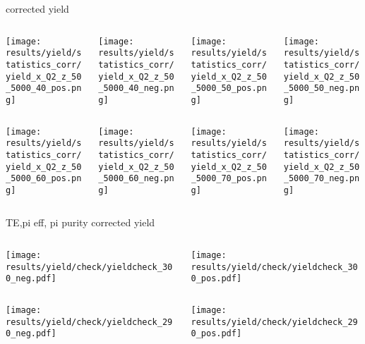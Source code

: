 \begin{frame}{corrected yield}
\begin{columns}
\begin{column}[T]{0.25\textwidth}
\texttt{[image: results/yield/statistics\_corr/yield\_x\_Q2\_z\_50\_5000\_40\_pos.png]}
\end{column}
\begin{column}[T]{0.25\textwidth}
\texttt{[image: results/yield/statistics\_corr/yield\_x\_Q2\_z\_50\_5000\_40\_neg.png]}
\end{column}
\begin{column}[T]{0.25\textwidth}
\texttt{[image: results/yield/statistics\_corr/yield\_x\_Q2\_z\_50\_5000\_50\_pos.png]}
\end{column}
\begin{column}[T]{0.25\textwidth}
\texttt{[image: results/yield/statistics\_corr/yield\_x\_Q2\_z\_50\_5000\_50\_neg.png]}
\end{column}
\end{columns}
\begin{columns}
\begin{column}[T]{0.25\textwidth}
\texttt{[image: results/yield/statistics\_corr/yield\_x\_Q2\_z\_50\_5000\_60\_pos.png]}
\end{column}
\begin{column}[T]{0.25\textwidth}
\texttt{[image: results/yield/statistics\_corr/yield\_x\_Q2\_z\_50\_5000\_60\_neg.png]}
\end{column}
\begin{column}[T]{0.25\textwidth}
\texttt{[image: results/yield/statistics\_corr/yield\_x\_Q2\_z\_50\_5000\_70\_pos.png]}
\end{column}
\begin{column}[T]{0.25\textwidth}
\texttt{[image: results/yield/statistics\_corr/yield\_x\_Q2\_z\_50\_5000\_70\_neg.png]}
\end{column}
\end{columns}
\end{frame}
\begin{frame}{TE,pi eff, pi purity corrected yield}
\begin{columns}
\begin{column}[T]{0.5\textwidth}
\texttt{[image: results/yield/check/yieldcheck\_300\_neg.pdf]}
\end{column}
\begin{column}[T]{0.5\textwidth}
\texttt{[image: results/yield/check/yieldcheck\_300\_pos.pdf]}
\end{column}
\end{columns}
\begin{columns}
\begin{column}[T]{0.5\textwidth}
\texttt{[image: results/yield/check/yieldcheck\_290\_neg.pdf]}
\end{column}
\begin{column}[T]{0.5\textwidth}
\texttt{[image: results/yield/check/yieldcheck\_290\_pos.pdf]}
\end{column}
\end{columns}
\end{frame}
